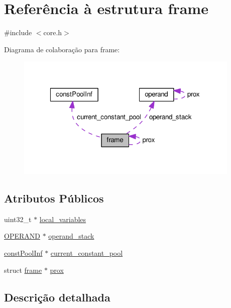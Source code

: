 \hypertarget{structframe}{\section{Referência à estrutura frame}
\label{structframe}
}


{\ttfamily \#include $<$core.\-h$>$}



Diagrama de colaboração para frame\-:\nopagebreak
\begin{figure}[H]
\begin{center}
\leavevmode
\includegraphics[width=303pt]{structframe__coll__graph}
\end{center}
\end{figure}
\subsection*{Atributos Públicos}
\begin{DoxyCompactItemize}
\item 
uint32\-\_\-t $\ast$ \hyperlink{structframe_afb48efe21a0642a382ef875628272cfd}{local\-\_\-variables}
\item 
\hyperlink{core_8h_a57370c151bf2eefc3bd6e2d13b70e7c9}{O\-P\-E\-R\-A\-N\-D} $\ast$ \hyperlink{structframe_a0e69123161d7ee38be16d922f09dc320}{operand\-\_\-stack}
\item 
\hyperlink{structconst_pool_inf}{const\-Pool\-Inf} $\ast$ \hyperlink{structframe_a44e706fb58a455a533afd748c097c9d0}{current\-\_\-constant\-\_\-pool}
\item 
struct \hyperlink{structframe}{frame} $\ast$ \hyperlink{structframe_ad5c645b97d4a17c7352bf29e7396cea4}{prox}
\end{DoxyCompactItemize}


\subsection{Descrição detalhada}


